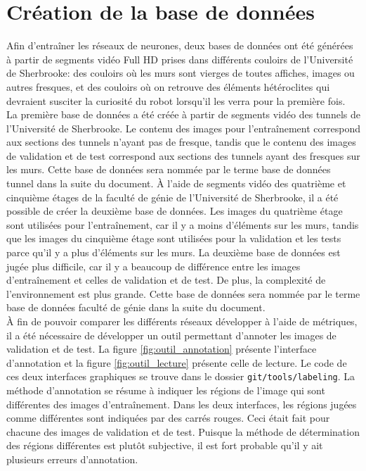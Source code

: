 \section{Création de la base de données}
    Afin d'entraîner les réseaux de neurones, deux bases de données ont été générées à partir de segments vidéo Full HD prises dans différents couloirs de l’Université de Sherbrooke: des couloirs où les murs sont vierges de toutes affiches, images ou autres fresques, et des couloirs où on retrouve des éléments hétéroclites qui devraient susciter la curiosité du robot lorsqu’il les verra pour la première fois.\\
    
    La première base de données a été créée à partir de segments vidéo des tunnels de l'Université de Sherbrooke. Le contenu des images pour l'entraînement correspond aux sections des tunnels n'ayant pas de fresque, tandis que le contenu des images de validation et de test correspond aux sections des tunnels ayant des fresques sur les murs. Cette base de données sera nommée par le terme base de données tunnel dans la suite du document. À l'aide de segments vidéo des quatrième et cinquième étages de la faculté de génie de l'Université de Sherbrooke, il a été possible de créer la deuxième base de données. Les images du quatrième étage sont utilisées pour l'entraînement, car il y a moins d'éléments sur les murs, tandis que les images du cinquième étage sont utilisées pour la validation et les tests parce qu'il y a plus d'éléments sur les murs. La deuxième base de données est jugée plus difficile, car il y a beaucoup de différence entre les images d'entraînement et celles de validation et de test. De plus, la complexité de l'environnement est plus grande. Cette base de données sera nommée par le terme base de données faculté de génie dans la suite du document.\\
    
    À fin de pouvoir comparer les différents réseaux développer à l'aide de métriques, il a été nécessaire de développer un outil permettant d'annoter les images de validation et de test. La figure \ref{fig:outil_annotation} présente l'interface d'annotation et la figure \ref{fig:outil_lecture} présente celle de lecture. Le code de ces deux interfaces graphiques se trouve dans le dossier \texttt{git/tools/labeling}. La méthode d'annotation se résume à indiquer les régions de l'image qui sont différentes des images d'entraînement. Dans les deux interfaces, les régions jugées comme différentes sont indiquées par des carrés rouges. Ceci était fait pour chacune des images de validation et de test. Puisque la méthode de détermination des régions différentes est plutôt subjective, il est fort probable qu'il y ait plusieurs erreurs d'annotation.
    
